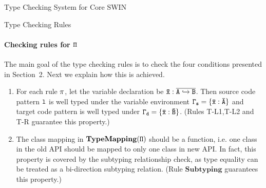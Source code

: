 \begin{section}{Type Checking System for Core SWIN}
\begin{subsection}{Type Checking Rules}



\paragraph{Checking rules for $\tt\Pi$}
The main goal of the type checking rules is to check the four
conditions presented in Section~2. Next we explain how this is achieved.


\begin{enumerate}
\item For each rule $\tt\pi$, let the variable declaration be
  $\tt\bar{x}:\overline{A\hookrightarrow B}$. Then source code pattern $\tt
  l$ is well typed under the variable environment
  $\tt\Gamma_s=\{\bar{x}:\bar{A}\}$ and target code pattern is well
  typed under $\tt\Gamma_d=\{\bar{x}:\bar{B}\}$. (Rules T-L1,T-L2 and
  T-R guarantee this property.)

\item The class mapping in $\tt \mathbf{TypeMapping}(\Pi)$ should be a
  function, i.e. one class in the old API should be mapped to only one
  class in new API. In fact, this property is covered by the subtyping relationship check,
  as type equality can be treated as a bi-direction subtyping
  relation. (Rule $\mathbf{Subtyping}$ guarantees this property.)


\end{enumerate}
\end{subsection}
\end{section}
